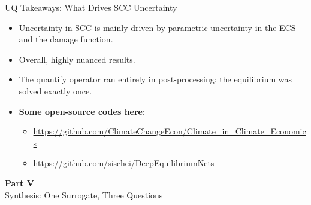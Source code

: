 \documentclass[aspectratio=169,11pt]{beamer}
\begin{document}
\begin{frame}{UQ Takeaways: What Drives SCC Uncertainty}
\begin{itemize}\itemsep6pt
	\item Uncertainty in SCC is mainly driven by parametric uncertainty in the ECS and the damage function.
 	\item Overall, highly nuanced results.
    \item The quantify operator ran entirely in post-processing: the equilibrium was solved exactly once.
    \item \textbf{Some open-source codes here}:
    \begin{itemize}
        \item \url{https://github.com/ClimateChangeEcon/Climate_in_Climate_Economics}
        \item \url{https://github.com/sischei/DeepEquilibriumNets}
    \end{itemize}
\end{itemize}
\end{frame}



\begin{frame}{}
\vfill
\begin{center}
{\Huge \textcolor{uzhblue}{\textbf{Part V}}}\\[12pt]
{\LARGE Synthesis: One Surrogate, Three Questions}
\end{center}
\vfill
\end{frame}
\end{document}
